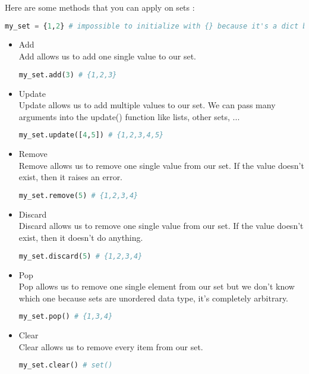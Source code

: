 \documentclass[a4paper, 12pt, titlepage]{scrartcl} %
\begin{document}
Here are some methods that you can apply on sets : 
\begin{lstlisting}[language=Python]
my_set = {1,2} # impossible to initialize with {} because it's a dict but possible with set()
\end{lstlisting} \vspace{5mm}

\begin{itemize}
\item Add \\
Add allows us to add one single value to our set.
\begin{lstlisting}[language=Python]
my_set.add(3) # {1,2,3} 
\end{lstlisting} \vspace{5mm}

\item Update \\
Update allows us to add multiple values to our set. We can pass many arguments into the update() function like lists, other sets, ...
\begin{lstlisting}[language=Python]
my_set.update([4,5]) # {1,2,3,4,5}
\end{lstlisting} \vspace{5mm}

\item Remove \\
Remove allows us to remove one single value from our set. If the value doesn't exist, then it raises an error.
\begin{lstlisting}[language=Python]
my_set.remove(5) # {1,2,3,4}
\end{lstlisting} \vspace{5mm}

\item Discard \\
Discard allows us to remove one single value from our set. If the value doesn't exist, then it doesn't do anything. 
\begin{lstlisting}[language=Python]
my_set.discard(5) # {1,2,3,4}
\end{lstlisting} \vspace{5mm}

\item Pop \\
Pop allows us to remove one single element from our set but we don't know which one because sets are unordered data type, it's completely arbitrary.
\begin{lstlisting}[language=Python]
my_set.pop() # {1,3,4}
\end{lstlisting} \vspace{5mm}

\item Clear \\
Clear allows us to remove every item from our set.
\begin{lstlisting}[language=Python]
my_set.clear() # set()
\end{lstlisting} \vspace{5mm}
\end{itemize} \vspace{5mm}
\end{document}
